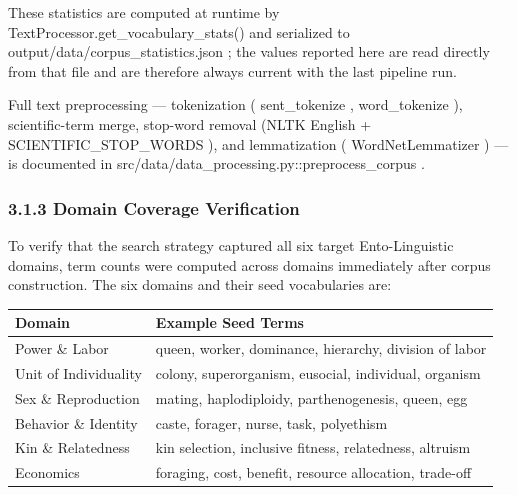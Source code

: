\documentclass[
]{article}
\newcounter{none} %
\numberwithin{equation}{section}
\renewcommand{\texttt}[1]{%
    \colorbox{codebg}{\color{codefg}\ttfamily #1}%
}
\begin{document}
These statistics are computed at runtime by
\texttt{TextProcessor.get\_vocabulary\_stats()} and serialized to
\texttt{output/data/corpus\_statistics.json}; the values reported here
are read directly from that file and are therefore always current with
the last pipeline run.

Full text preprocessing --- tokenization (\texttt{sent\_tokenize},
\texttt{word\_tokenize}), scientific-term merge, stop-word removal (NLTK
English + \texttt{SCIENTIFIC\_STOP\_WORDS}), and lemmatization
(\texttt{WordNetLemmatizer}) --- is documented in
\texttt{src/data/data\_processing.py::preprocess\_corpus}.

\subsubsection{3.1.3 Domain Coverage
Verification}\label{domain-coverage-verification}

To verify that the search strategy captured all six target
Ento-Linguistic domains, term counts were computed across domains
immediately after corpus construction. The six domains and their seed
vocabularies are:

{\def\LTcaptype{none} %
\begin{longtable}[]{@{}
  >{\raggedright\arraybackslash}p{}
  >{\raggedright\arraybackslash}p{}@{}}
\toprule\noalign{}
\begin{minipage}[b]{\linewidth}\raggedright
Domain
\end{minipage} & \begin{minipage}[b]{\linewidth}\raggedright
Example Seed Terms
\end{minipage} \\
\midrule\noalign{}
\endhead
\bottomrule\noalign{}
\endlastfoot
Power \& Labor & queen, worker, dominance, hierarchy, division of
labor \\
Unit of Individuality & colony, superorganism, eusocial, individual,
organism \\
Sex \& Reproduction & mating, haplodiploidy, parthenogenesis, queen,
egg \\
Behavior \& Identity & caste, forager, nurse, task, polyethism \\
Kin \& Relatedness & kin selection, inclusive fitness, relatedness,
altruism \\
Economics & foraging, cost, benefit, resource allocation, trade-off \\
\end{longtable}
}
\end{document}

